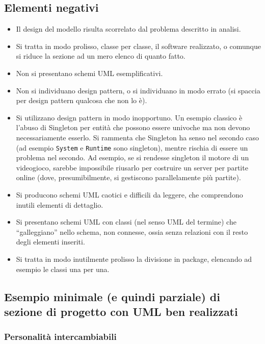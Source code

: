 \documentclass[a4paper,12pt]{report}
\begin{document}
\subsection*{Elementi negativi}
\begin{itemize}
	\item Il design del modello risulta scorrelato dal problema descritto in analisi.
	\item Si tratta in modo prolisso, classe per classe, il software realizzato, o comunque si riduce la sezione ad un mero elenco di quanto fatto.
	\item Non si presentano schemi UML esemplificativi.
	\item Non si individuano design pattern, o si individuano in modo errato (si spaccia per design pattern qualcosa che non lo è).
	\item Si utilizzano design pattern in modo inopportuno. Un esempio classico è l'abuso di
	      Singleton per entità che possono essere univoche ma non devono necessariamente esserlo. Si rammenta
	      che Singleton ha senso nel secondo caso (ad esempio \texttt{System} e \texttt{Runtime} sono
	      singleton), mentre rischia di essere un problema nel secondo. Ad esempio, se si rendesse singleton
	      il motore di un videogioco, sarebbe impossibile riusarlo per costruire un server per partite online
	      (dove, presumibilmente, si gestiscono parallelamente più partite).
	\item Si producono schemi UML caotici e difficili da leggere, che comprendono inutili elementi di dettaglio.
	\item Si presentano schemi UML con classi (nel senso UML del termine) che ``galleggiano'' nello schema, non connesse, ossia senza relazioni con il resto degli elementi inseriti.
	\item Si tratta in modo inutilmente prolisso la divisione in package, elencando ad esempio le classi una per una.
\end{itemize}

\subsection*{Esempio minimale (e quindi parziale) di sezione di progetto con UML ben realizzati}

\subsubsection{Personalità intercambiabili}
\end{document}
